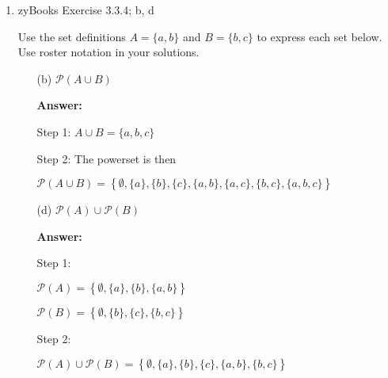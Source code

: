 \documentclass[14pt]{extreport}
\newcommand{\answer}[0]{\medskip \textbf{Answer:} \medskip}
\newcommand{\union}[0]{\cup}
\begin{document}
\begin{enumerate}
\begin{enumerate}
            \item[(f)] \( \bigcup_{i=1}^{100} C_i \)
            
                \answer

                Use the same logic as in (e), except we look at the largest possible domain. So \( \bigcup_{i=1}^{100} C_i = \left\{ x \in \mathbb{R}: -1 \leq x \leq 1 \right\} \).

        \end{enumerate}

    \item zyBooks Exercise 3.3.4; b, d
    
    Use the set definitions \( A = \{a, b\} \) and \( B = \{b, c\} \) to express each set below. Use roster notation in your solutions.
    
        \begin{enumerate}
            
            \item[(b)] \( \mathcal{P}(A \union B) \)
            
                \answer

                Step 1: \( A \union B = \{a, b, c\} \)

                \medskip

                Step 2: The powerset is then 
                
                \( \mathcal{P}(A \union B) = \left\{ \emptyset, \{a\}, \{b\}, \{c\}, \{a, b\}, \{a, c\}, \{b, c\}, \{a, b, c\} \right\} \)

            \item[(d)] \( \mathcal{P}(A) \union \mathcal{P}(B) \)
            
                \answer

                Step 1: 
                
                \( \mathcal{P}(A) = \left\{ \emptyset, \{a\}, \{b\}, \{a, b\} \right\} \)

                \( \mathcal{P}(B) = \left\{ \emptyset, \{b\}, \{c\}, \{b, c\} \right\} \)

                \medskip

                Step 2:

                \( \mathcal{P}(A) \union \mathcal{P}(B) = \left\{ \emptyset, \{a\},\{b\}, \{c\}, \{a, b\}, \{b, c\} \right\} \)

        \end{enumerate}
        
\end{enumerate}
\newpage
\end{document}
